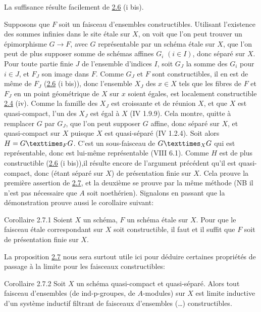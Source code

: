 \documentclass[10pt]{../fichiers-configuration-latex/smfart}
\begin{document}

La suffisance résulte facilement de \hyperref[IX.prop2.6]{2.6} (i bis).

Supposons que $F$ soit un faisceau d'ensembles
constructibles. Utilisant l'existence des sommes infinies dans le site
étale sur $X$, on voit que l'on peut trouver un épimorphisme
$G\rightarrow F$, avec $G$ représentable par un schéma étale sur $X$,
que l'on peut de plus supposer somme de schémas affines $G_i$ $(i\in I)$,
donc séparé sur $X$. Pour toute partie finie $J$ de l'ensemble
d'indices $I$, soit $G_J$ la somme des $G_i$ pour $i\in J$, et $F_J$
son image dans $F$. Comme $G_J$ et $F$ sont constructibles, il en est
de même de $F_J$ (\hyperref[IX.prop2.6]{2.6} (i bis)), donc l'ensemble $X_J$ des $x\in X$
tels que les fibres de $F$ et $F_J$ en un point géométrique de $X$ sur
$x$ soient égales, est localement constructible \hyperref[IX.prop2.4]{2.4} (iv). Comme la
famille des $X_J$ est croissante et de réunion $X$, et que $X$ est
quasi-compact, l'un des $X_J$ est égal à $X$ (\EGA IV 1.9.9). Cela
montre, quitte à remplacer $G$ par $G_J$, que l'on peut supposer $G$
affine, donc séparé sur $X$, et quasi-compact sur $X$ puisque $X$ est
quasi-séparé (\EGA IV 1.2.4). Soit alors $H=\fprod{G}{G}{F}$. C'est un
sous-faisceau de $\fprod{G}{G}{X}$ qui est représentable, donc est
lui-même représentable (VIII 6.1). Comme $H$ est de plus constructible
(\hyperref[IX.prop2.6]{2.6} (i bis)),\pageoriginale il résulte encore de l'argument précédent
qu'il est quasi-compact, donc (étant séparé sur $X$) de présentation
finie sur $X$. Cela prouve la première assertion de \hyperref[IX.prop2.7]{2.7}, et la
deuxième se prouve par la même méthode (NB il n'est pas nécessaire que
$A$ soit noethérien). Signalons en passant que la démonstration prouve
aussi le corollaire suivant:

\begin{enonce*}{Corollaire 2.7.1}
Soient $X$ un schéma, $F$ un schéma étale sur $X$. Pour que le
faisceau étale correspondant sur $X$ soit constructible, il faut et il
suffit que $F$ soit de présentation finie sur $X$.
\end{enonce*}

La proposition \hyperref[IX.prop2.7]{2.7} nous sera surtout utile ici pour déduire certaines
propriétés de passage à la limite pour les faisceaux constructibles:

\begin{enonce*}{Corollaire 2.7.2}
Soit $X$ un schéma quasi-compact et quasi-séparé. Alors tout faisceau
d'ensembles (\resp de ind-p-groupes, \resp de $A$-modules) sur $X$ est
limite inductive d'un système inductif filtrant de faisceaux
d'ensembles (\resp\ldots) constructibles.
\end{enonce*}
\end{document}
